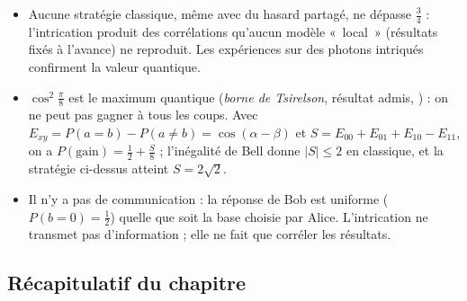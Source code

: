 \begin{remarque}
\begin{itemize}[nosep]
  \item Aucune stratégie classique, même avec du hasard partagé, ne dépasse $\frac34$ : l'intrication
        produit des corrélations qu'aucun modèle «~local~» (résultats fixés à l'avance) ne reproduit.
        Les expériences sur des photons intriqués confirment la valeur quantique.
  \item $\cos^2\frac\pi8$ est le maximum quantique (\emph{borne de Tsirelson}, résultat admis,
        \cite{tsirelson1980}) : on ne peut pas gagner à tous les coups. Avec
        $E_{xy}=P(a=b)-P(a\neq b)=\cos(\alpha-\beta)$ et $S=E_{00}+E_{01}+E_{10}-E_{11}$, on a
        $P(\text{gain})=\frac12+\frac S8$ ; l'inégalité de Bell donne $|S|\leq2$ en classique, et la
        stratégie ci-dessus atteint $S=2\sqrt2$.
  \item Il n'y a pas de communication : la réponse de Bob est uniforme ($P(b=0)=\frac12$) quelle que
        soit la base choisie par Alice. L'intrication ne transmet pas d'information ; elle ne fait
        que corréler les résultats.
\end{itemize}
\end{remarque}

\clearpage
\subsection{Récapitulatif du chapitre}\label{sec:recap5}

